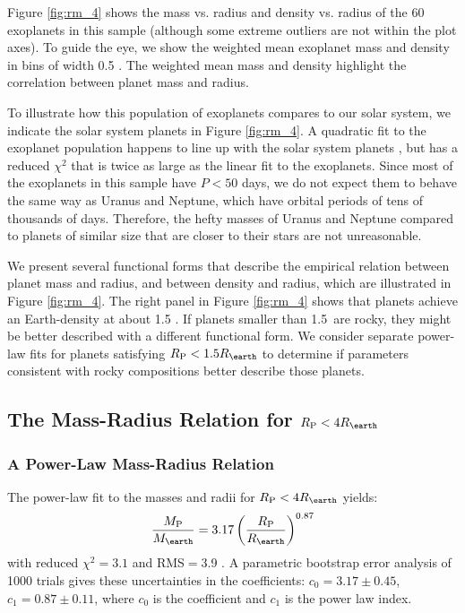 \documentclass[iop]{emulateapj}
\newcommand{\rspecial}{4 \rearth}
\begin{document}
Figure \ref{fig:rm_4} shows the mass vs. radius and density vs. radius of the 60 exoplanets in this sample (although some extreme outliers are not within the plot axes).  To guide the eye, we show the weighted mean exoplanet mass and density in bins of width 0.5 \rearth.  The weighted mean mass and density highlight the correlation between planet mass and radius.  

To illustrate how this population of exoplanets compares to our solar system, we indicate the solar system planets in Figure \ref{fig:rm_4}.  A quadratic fit to the exoplanet population happens to line up with the solar system planets \citep{Lissauer2011}, but has a reduced $\chi^2$ that is twice as large as the linear fit to the exoplanets.  Since most of the exoplanets in this sample have $P < 50$ days, we do not expect them to behave the same way as Uranus and Neptune, which have orbital periods of tens of thousands of days.  Therefore, the hefty masses of Uranus and Neptune compared to planets of similar size that are closer to their stars are not unreasonable.

We present several functional forms that describe the empirical relation between planet mass and radius, and between density and radius, which are illustrated in Figure \ref{fig:rm_4}.  The right panel in Figure \ref{fig:rm_4} shows that planets achieve an Earth-density at about 1.5 \rearth.  If planets smaller than 1.5\rearth\ are rocky, they might be better described with a different functional form.  We consider separate power-law fits for planets satisfying $\rpl < 1.5 \rearth$ to determine if parameters consistent with rocky compositions better describe those planets.

\subsection{The Mass-Radius Relation for $\rpl < \rspecial$}
\subsubsection{A Power-Law Mass-Radius Relation}
The power-law fit to the masses and radii for $\rpl < \rspecial$ yields:
\begin{equation}
\frac{\mpl}{\mearth} = 3.17 \left(\frac{\rpl}{\rearth}\right)^{0.87}
\label{eqn:mr_plaw}
\end{equation}
with reduced $\chi^2=3.1$ and RMS$=$3.9 \mearth.  A parametric bootstrap error analysis of 1000 trials gives these uncertainties in the coefficients: $c_0 = 3.17 \pm 0.45$, $c_1 = 0.87\pm 0.11$, where $c_0$ is the coefficient and $c_1$ is the power law index.
\end{document}
